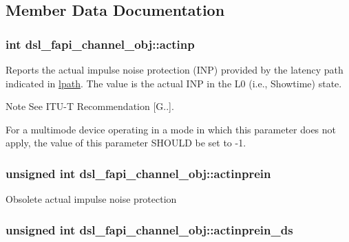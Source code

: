 \subsection{Member Data Documentation}
\hypertarget{structdsl__fapi__channel__obj_af95a0127772d8831b6fdd5e07dbf3964}{
\subsubsection[{actinp}]{\setlength{\rightskip}{0pt plus 5cm}int dsl\-\_\-fapi\-\_\-channel\-\_\-obj\-::actinp}}\label{structdsl__fapi__channel__obj_af95a0127772d8831b6fdd5e07dbf3964}
Reports the actual impulse noise protection (I\-N\-P) provided by the latency path indicated in \hyperlink{structdsl__fapi__channel__obj_a29ec0882fb5449a659485d51f50b3b52}{lpath}. The value is the actual I\-N\-P in the L0 (i.\-e., Showtime) state. \begin{DoxyNote}{Note}
See I\-T\-U-\/\-T Recommendation \mbox{[}G..\mbox{]}. 

For a multimode device operating in a mode in which this parameter does not apply, the value of this parameter S\-H\-O\-U\-L\-D be set to -\/1. 
\end{DoxyNote}
\hypertarget{structdsl__fapi__channel__obj_afb07611bd9eaae95be565a54d81bb8e2}{
\subsubsection[{actinprein}]{\setlength{\rightskip}{0pt plus 5cm}unsigned int dsl\-\_\-fapi\-\_\-channel\-\_\-obj\-::actinprein}}\label{structdsl__fapi__channel__obj_afb07611bd9eaae95be565a54d81bb8e2}
Obsolete actual impulse noise protection \hypertarget{structdsl__fapi__channel__obj_af83f970357fcaddae397d639f8a010b1}{
\subsubsection[{actinprein\-\_\-ds}]{\setlength{\rightskip}{0pt plus 5cm}unsigned int dsl\-\_\-fapi\-\_\-channel\-\_\-obj\-::actinprein\-\_\-ds}}\label{structdsl__fapi__channel__obj_af83f970357fcaddae397d639f8a010b1}
